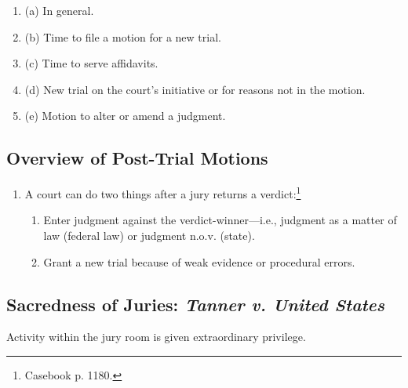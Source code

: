 \begin{enumerate}
    \item (a) In general.
    \item (b) Time to file a motion for a new trial.
    \item (c) Time to serve affidavits.
    \item (d) New trial on the court's initiative or for reasons not in the 
    motion.
    \item (e) Motion to alter or amend a judgment.
\end{enumerate}

\subsection{Overview of Post-Trial Motions}

\begin{enumerate}
    \item A court can do two things after a jury returns a 
    verdict:\footnote{Casebook p. 1180.}
    \begin{enumerate}
        \item Enter judgment against the verdict-winner---i.e., judgment as a 
        matter of law (federal law) or judgment n.o.v. (state).
        \item Grant a new trial because of weak evidence or procedural errors.
    \end{enumerate}
\end{enumerate}

\subsection{Sacredness of Juries: \emph{Tanner v. United States}}

Activity within the jury room is given extraordinary privilege.

